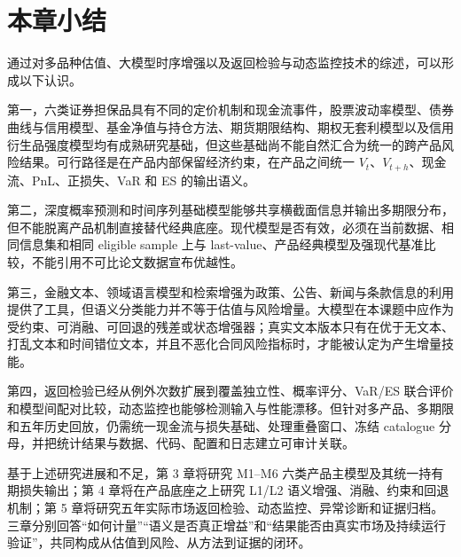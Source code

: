 \section{本章小结}

通过对多品种估值、大模型时序增强以及返回检验与动态监控技术的综述，可以形成以下认识。

第一，六类证券担保品具有不同的定价机制和现金流事件，股票波动率模型、债券曲线与信用模型、基金净值与持仓方法、期货期限结构、期权无套利模型以及信用衍生品强度模型均有成熟研究基础，但这些基础尚不能自然汇合为统一的跨产品风险结果。可行路径是在产品内部保留经济约束，在产品之间统一 \(V_t\)、\(V_{t+h}\)、现金流、PnL、正损失、VaR 和 ES 的输出语义。

第二，深度概率预测和时间序列基础模型能够共享横截面信息并输出多期限分布，但不能脱离产品机制直接替代经典底座。现代模型是否有效，必须在当前数据、相同信息集和相同 eligible sample 上与 last-value、产品经典模型及强现代基准比较，不能引用不可比论文数据宣布优越性。

第三，金融文本、领域语言模型和检索增强为政策、公告、新闻与条款信息的利用提供了工具，但语义分类能力并不等于估值与风险增量。大模型在本课题中应作为受约束、可消融、可回退的残差或状态增强器；真实文本版本只有在优于无文本、打乱文本和时间错位文本，并且不恶化合同风险指标时，才能被认定为产生增量技能。

第四，返回检验已经从例外次数扩展到覆盖独立性、概率评分、VaR/ES 联合评价和模型间配对比较，动态监控也能够检测输入与性能漂移。但针对多产品、多期限和五年历史回放，仍需统一现金流与损失基础、处理重叠窗口、冻结 catalogue 分母，并把统计结果与数据、代码、配置和日志建立可审计关联。

基于上述研究进展和不足，第 3 章将研究 M1--M6 六类产品主模型及其统一持有期损失输出；第 4 章将在产品底座之上研究 L1/L2 语义增强、消融、约束和回退机制；第 5 章将研究五年实际市场返回检验、动态监控、异常诊断和证据归档。三章分别回答“如何计量”“语义是否真正增益”和“结果能否由真实市场及持续运行验证”，共同构成从估值到风险、从方法到证据的闭环。
